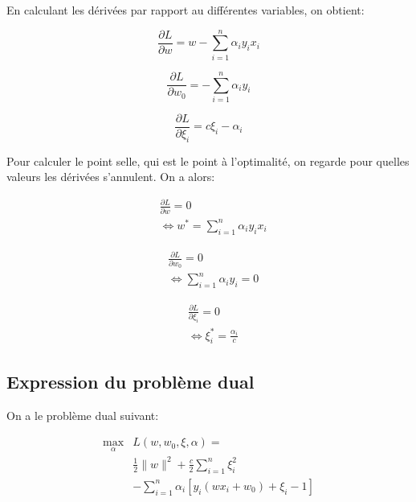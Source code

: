 \documentclass{article}
\begin{document}
\begin{multicols}{2}
En calculant les dérivées par rapport au différentes variables, on obtient:

\begin{equation*}
    \frac{\partial L}{\partial w} = w - \sum_{i=1}^{n}\alpha_i y_i x_i 
\end{equation*}

\begin{equation*}
    \frac{\partial L}{\partial w_0} = - \sum_{i=1}^{n} \alpha_i y_i
\end{equation*}

\begin{equation*}
    \frac{\partial L}{\partial \xi_i} = c \xi_i - \alpha_i
\end{equation*}

Pour calculer le point selle, qui est le point à l'optimalité, on regarde pour
quelles valeurs les dérivées s'annulent.
On a alors:

\begin{equation}
    \begin{split}
        & \frac{\partial L}{\partial w} = 0 \\
        & \iff w^* = \sum_{i = 1}^n \alpha_i y_i x_i
    \end{split}
\end{equation}

\begin{equation}
    \begin{split}
        & \frac{\partial L}{\partial w_0} = 0 \\
        & \iff \sum_{i = 1}^n \alpha_i y_i = 0
    \end{split}
\end{equation}

\begin{equation}
    \begin{split}
        & \frac{\partial L}{\partial \xi_i} = 0 \\
        & \iff \xi_i^* = \frac{\alpha_i}{c}
    \end{split}
\end{equation}

\subsection{Expression du problème dual}\label{subsec:ex24}

On a le problème dual suivant:

\begin{equation*}
    \begin{split}
        \operatorname*{max}_{\alpha}
        & \textit{L}(w, w_0, \xi, \alpha) = \\
        & \frac{1}{2} \parallel w \parallel^2 + \frac{c}{2} \sum_{i = 1}^{n}
        \xi_i^2 \\
        & - \sum_{i = 1}^{n} \alpha_i [y_i (w x_i + w_0) + \xi_i - 1]
    \end{split}
\end{equation*}


\end{multicols}
\end{document}
